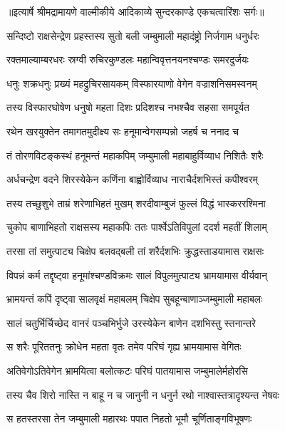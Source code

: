 {॥इत्यार्षे श्रीमद्रामायणे वाल्मीकीये आदिकाव्ये सुन्दरकाण्डे एकचत्वारिंशः सर्गः॥}


\twolineshloka
{सन्दिष्टो राक्षसेन्द्रेण प्रहस्तस्य सुतो बली}
{जम्बुमाली महादंष्ट्रो निर्जगाम धनुर्धरः} %

\twolineshloka
{रक्तमाल्याम्बरधरः स्रग्वी रुचिरकुण्डलः}
{महान्विवृत्तनयनश्चण्डः समरदुर्जयः} %

\twolineshloka
{धनुः शक्रधनुः प्रख्यं महद्रुचिरसायकम्}
{विस्फारयाणो वेगेन वज्राशनिसमस्वनम्} %

\twolineshloka
{तस्य विस्फारघोषेण धनुषो महता दिशः}
{प्रदिशश्च नभश्चैव सहसा समपूर्यत} %

\twolineshloka
{रथेन खरयुक्तेन तमागतमुदीक्ष्य सः}
{हनूमान्वेगसम्पन्नो जहर्ष च ननाद च} %

\twolineshloka
{तं तोरणविटङ्कस्थं हनूमन्तं महाकपिम्}
{जम्बुमाली महाबाहुर्विव्याध निशितैः शरैः} %

\twolineshloka
{अर्धचन्द्रेण वदने शिरस्येकेन कर्णिना}
{बाह्वोर्विव्याध नाराचैर्दशभिस्तं कपीश्वरम्} %

\twolineshloka
{तस्य तच्छुशुभे ताम्रं शरेणाभिहतं मुखम्}
{शरदीवाम्बुजं फुल्लं विद्धं भास्कररश्मिना} %

\twolineshloka
{चुकोप बाणाभिहतो राक्षसस्य महाकपिः}
{ततः पार्श्वेऽतिविपुलां ददर्श महतीं शिलाम्} %

\twolineshloka
{तरसा तां समुत्पाट्य चिक्षेप बलवद्बली}
{तां शरैर्दशभिः क्रुद्धस्ताडयामास राक्षसः} %

\twolineshloka
{विपन्नं कर्म तद्दृष्ट्वा हनूमांश्चण्डविक्रमः}
{सालं विपुलमुत्पाट्य भ्रामयामास वीर्यवान्} %

\twolineshloka
{भ्रामयन्तं कपिं दृष्ट्वा सालवृक्षं महाबलम्}
{चिक्षेप सुबहून्बाणाञ्जम्बुमाली महाबलः} %

\twolineshloka
{सालं चतुर्भिर्चिच्छेद वानरं पञ्चभिर्भुजे}
{उरस्येकेन बाणेन दशभिस्तु स्तनान्तरे} %

\twolineshloka
{स शरैः पूरिततनुः क्रोधेन महता वृतः}
{तमेव परिघं गृह्य भ्रामयामास वेगितः} %

\twolineshloka
{अतिवेगोऽतिवेगेन भ्रामयित्वा बलोत्कटः}
{परिघं पातयामास जम्बुमालेर्महोरसि} %

\twolineshloka
{तस्य चैव शिरो नास्ति न बाहू न च जानुनी}
{न धनुर्न रथो नाश्वास्तत्रादृश्यन्त नेषवः} %

\twolineshloka
{स हतस्तरसा तेन जम्बुमाली महारथः}
{पपात निहतो भूमौ चूर्णिताङ्गविभूषणः} %

